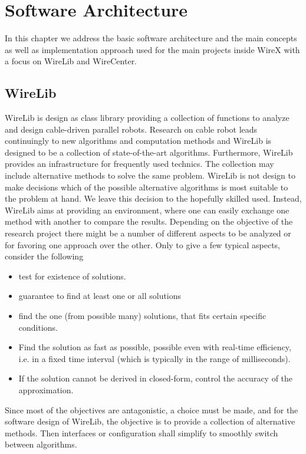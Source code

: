 \documentclass[11pt,a4paper,onepage,openany]{book}
\begin{document}
\chapter{Software Architecture}\label{sec:SoftwareArchitecture}%
In this chapter we address the basic software architecture and the main
concepts as well as implementation approach used for the main projects inside
WireX with a focus on WireLib and WireCenter.

\section{WireLib}
WireLib is design as class library providing a collection of functions to
analyze and design cable-driven parallel robots. Research on cable robot leads
continuingly to new algorithms and computation methods and WireLib is designed
to be a collection of state-of-the-art algorithms. Furthermore, WireLib
provides an infrastructure for frequently used technics. The collection may
include alternative methods to solve the same problem. WireLib is not design to
make decisions which of the possible alternative algorithms is most suitable to
the problem at hand. We leave this decision to the hopefully skilled used.
Instead, WireLib aims at providing an environment, where one can easily
exchange one method with another to compare the results. Depending on the
objective of the research project there might be a number of different aspects
to be analyzed or for favoring one approach over the other. Only to give a few
typical aspects, consider the following
\begin{itemize}
  \item test for existence of solutions.
  \item guarantee to find at least one or all solutions
  \item find the one (from possible many) solutions, that fits certain
      specific conditions.
  \item Find the solution as fast as possible, possible even with
         real-time efficiency, i.e. in a fixed time interval (which is
         typically in the range of milliseconds).
  \item If the solution cannot be derived in closed-form, control the
      accuracy of the approximation.
\end{itemize}
Since most of the objectives are antagonistic, a choice must be made, and for
the software design of WireLib, the objective is to provide a collection of
alternative methods. Then interfaces or configuration shall simplify to
smoothly switch between algorithms.
\end{document}
